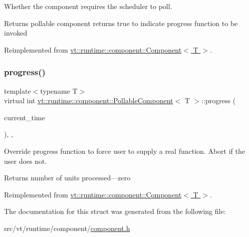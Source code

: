 Whether the component requires the scheduler to poll. 

\begin{DoxyReturn}{Returns}
pollable component returns true to indicate progress function to be invoked 
\end{DoxyReturn}


Reimplemented from \hyperlink{structvt_1_1runtime_1_1component_1_1_component_a5a15bd0369a9d3765a6c70249bada96f}{vt\+::runtime\+::component\+::\+Component$<$ T $>$}.

\mbox{\label{structvt_1_1runtime_1_1component_1_1_pollable_component_a69282f6c04cf56740dc6372abcf0f820}} 
\subsubsection{\texorpdfstring{progress()}{progress()}}
{\footnotesize\ttfamily template$<$typename T$>$ \\
virtual int \hyperlink{structvt_1_1runtime_1_1component_1_1_pollable_component}{vt\+::runtime\+::component\+::\+Pollable\+Component}$<$ T $>$\+::progress (\begin{DoxyParamCaption}\item[{\mbox{[}\mbox{[}maybe\+\_\+unused\mbox{]} \mbox{]} \hyperlink{namespacevt_a2b9f28078dc309ad0706b69ded743e69}{Time\+Type}}]{current\+\_\+time }\end{DoxyParamCaption})\hspace{0.3cm}{\ttfamily [inline]}, {\ttfamily [override]}, {\ttfamily [virtual]}}



Override progress function to force user to supply a real function. Abort if the user does not. 

\begin{DoxyReturn}{Returns}
number of units processed---zero 
\end{DoxyReturn}


Reimplemented from \hyperlink{structvt_1_1runtime_1_1component_1_1_component_a1d9147ecabbb0ebc43be3517d9e500c4}{vt\+::runtime\+::component\+::\+Component$<$ T $>$}.



The documentation for this struct was generated from the following file\+:\begin{DoxyCompactItemize}
\item 
src/vt/runtime/component/\hyperlink{component_8h}{component.\+h}\end{DoxyCompactItemize}
